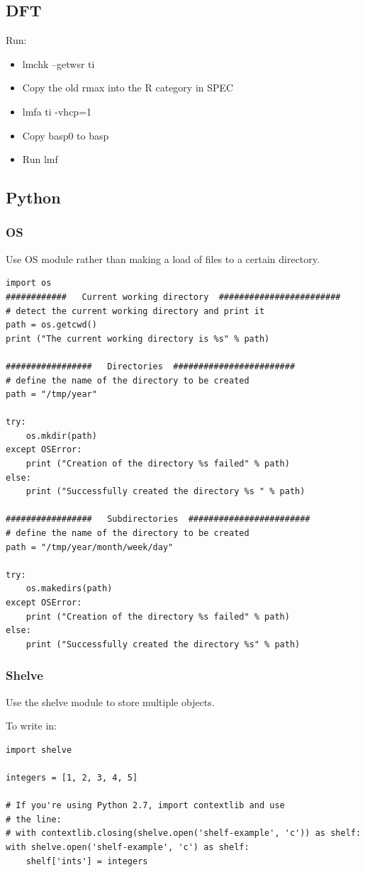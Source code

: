 \documentclass[11pt]{article}
\begin{document}
\subsection{DFT}
\label{sec-2-8}
Run:
\begin{itemize}
\item lmchk --getwsr ti
\item Copy the old rmax into the R category in SPEC
\item lmfa ti -vhcp=1
\item Copy basp0 to basp
\item Run lmf
\end{itemize}
\subsection{Python}
\label{sec-2-9}
\subsubsection{OS}
\label{sec-2-9-1}
Use OS module rather than making a load of files to a certain directory. 
\begin{verbatim}
import os
############   Current working directory  ########################
# detect the current working directory and print it
path = os.getcwd()  
print ("The current working directory is %s" % path) 

#################   Directories  ########################
# define the name of the directory to be created
path = "/tmp/year"

try:  
    os.mkdir(path)
except OSError:  
    print ("Creation of the directory %s failed" % path)
else:  
    print ("Successfully created the directory %s " % path)

#################   Subdirectories  ########################
# define the name of the directory to be created
path = "/tmp/year/month/week/day"

try:  
    os.makedirs(path)
except OSError:  
    print ("Creation of the directory %s failed" % path)
else:  
    print ("Successfully created the directory %s" % path)
\end{verbatim}
\subsubsection{Shelve}
\label{sec-2-9-2}
Use the shelve module to store multiple objects. 

To write in:
\begin{verbatim}
import shelve

integers = [1, 2, 3, 4, 5]

# If you're using Python 2.7, import contextlib and use
# the line:
# with contextlib.closing(shelve.open('shelf-example', 'c')) as shelf:
with shelve.open('shelf-example', 'c') as shelf:
    shelf['ints'] = integers
\end{verbatim}
\end{document}
